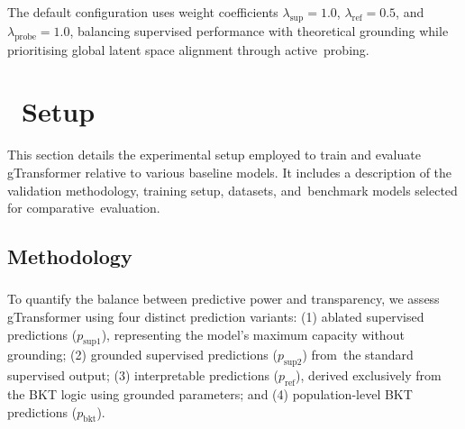 \documentclass[applsci,article,accept,moreauthors,pdftex]{Definitions/mdpi}
\begin{document}
The default configuration uses weight coefficients $\lambda_{\text{sup}} = 1.0$, $\lambda_{\text{ref}} = 0.5$, and \mbox{$\lambda_{\text{probe}} = 1.0$}, balancing supervised performance with theoretical grounding while {prioritising} global latent space alignment through active~probing.

\section{%
~Setup} \label{sec_experiment}

This section details the experimental setup employed to train and evaluate gTransformer relative to various baseline models. It includes a description of the validation methodology, training setup, datasets, and~benchmark models selected for comparative~evaluation. 

\subsection{Methodology} \label{sec_methodology}
\unskip

\subsubsection{{}}%

{To quantify the balance between predictive power and transparency, we assess gTransformer using four distinct prediction variants:}
{(1) ablated supervised predictions ($p_{\text{sup}1}$), representing the model's maximum capacity without grounding;}
{(2) grounded supervised predictions ($p_{\text{sup}2}$) from~the standard supervised output;}
{(3) interpretable predictions ($p_{\text{ref}}$), derived exclusively from the BKT logic using grounded parameters; and}
{(4) population-level BKT predictions ($p_{\text{bkt}}$).}
\end{document}
